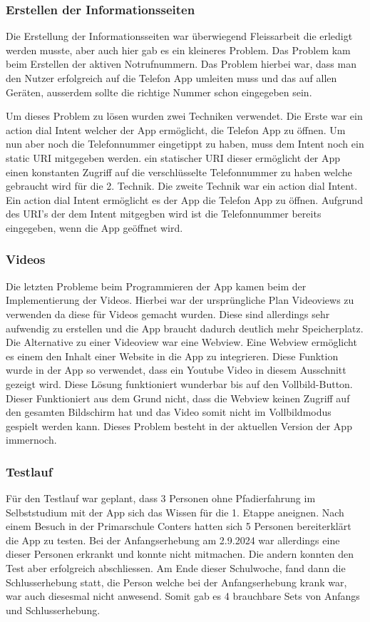 \subsubsection{Erstellen der Informationsseiten}

Die Erstellung der Informationsseiten war überwiegend Fleissarbeit die erledigt werden musste, aber auch hier gab es ein kleineres Problem. Das Problem kam beim Erstellen der aktiven Notrufnummern. Das Problem hierbei war, dass man den Nutzer erfolgreich auf die Telefon App umleiten muss und das auf allen Geräten, ausserdem sollte die richtige Nummer schon eingegeben sein.\par
Um dieses Problem zu lösen wurden zwei Techniken verwendet. Die Erste war ein action dial Intent welcher der App ermöglicht, die Telefon App zu öffnen\cite{noauthor_intent_nodate}. Um nun aber noch die Telefonnummer eingetippt zu haben, muss dem Intent noch ein static URI mitgegeben werden. 
ein statischer URI \cite{noauthor_uri_nodate} dieser ermöglicht der App einen konstanten Zugriff auf die verschlüsselte Telefonnummer zu haben welche gebraucht wird für die 2. Technik. Die zweite Technik war ein action dial Intent. Ein action dial Intent ermöglicht es der App die Telefon App zu öffnen. Aufgrund des URI's der dem Intent mitgegben wird ist die Telefonnummer bereits eingegeben, wenn die App geöffnet wird.

\subsubsection{Videos}

Die letzten Probleme beim Programmieren der App kamen beim der Implementierung der Videos. Hierbei war der ursprüngliche Plan Videoviews zu verwenden da diese für Videos gemacht wurden. Diese sind allerdings sehr aufwendig zu erstellen und die App braucht dadurch deutlich mehr Speicherplatz. Die Alternative zu einer Videoview war eine Webview. Eine Webview ermöglicht es einem den Inhalt einer Website in die App zu integrieren. Diese Funktion wurde in der App so verwendet, dass ein Youtube Video in diesem Ausschnitt gezeigt wird. Diese Lösung funktioniert wunderbar bis auf den Vollbild-Button. Dieser Funktioniert aus dem Grund nicht, dass die Webview keinen Zugriff auf den gesamten Bildschirm hat und das Video somit nicht im Vollbildmodus gespielt werden kann. Dieses Problem besteht in der aktuellen Version der App immernoch.

\subsubsection{Testlauf}

Für den Testlauf war geplant, dass 3 Personen ohne Pfadierfahrung im Selbststudium mit der App sich das Wissen für die 1. Etappe aneignen. Nach einem Besuch in der Primarschule Conters hatten sich 5 Personen bereiterklärt die App zu testen. Bei der Anfangserhebung am 2.9.2024 war allerdings eine dieser Personen erkrankt und konnte nicht mitmachen. Die andern konnten den Test aber erfolgreich abschliessen. Am Ende dieser Schulwoche, fand dann die Schlusserhebung statt, die Person welche bei der Anfangserhebung krank war, war auch diesesmal nicht anwesend. Somit gab es 4 brauchbare Sets von Anfangs und Schlusserhebung. 